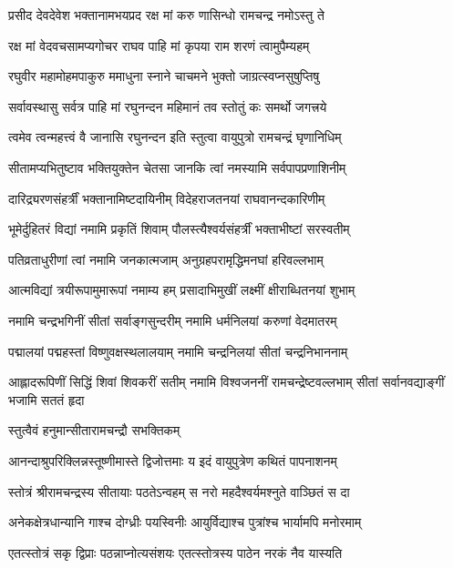 \twolineshloka
{प्रसीद देवदेवेश भक्तानामभयप्रद}
{रक्ष मां करु णासिन्धो रामचन्द्र नमोऽस्तु ते}%

\twolineshloka
{रक्ष मां वेदवचसामप्यगोचर राघव}
{पाहि मां कृपया राम शरणं त्वामुपैम्यहम्}%

\twolineshloka
{रघुवीर महामोहमपाकुरु ममाधुना}
{स्नाने चाचमने भुक्तो जाग्रत्स्वप्नसुषुप्तिषु}%

\twolineshloka
{सर्वावस्थासु सर्वत्र पाहि मां रघुनन्दन}
{महिमानं तव स्तोतुं कः समर्थो जगत्त्रये}%

\twolineshloka
{त्वमेव त्वन्महत्त्वं वै जानासि रघुनन्दन}
{इति स्तुत्वा वायुपुत्रो रामचन्द्रं घृणानिधिम्}%

\twolineshloka
{सीतामप्यभितुष्टाव भक्तियुक्तेन चेतसा}
{जानकि त्वां नमस्यामि सर्वपापप्रणाशिनीम्}%

\twolineshloka
{दारिद्र्यरणसंहर्त्रीं भक्तानामिष्टदायिनीम्}
{विदेहराजतनयां राघवानन्दकारिणीम्}%

\twolineshloka
{भूमेर्दुहितरं विद्यां नमामि प्रकृतिं शिवाम्}
{पौलस्त्यैश्वर्यसंहर्त्रीं भक्ताभीष्टां सरस्वतीम्}%

\twolineshloka
{पतिव्रताधुरीणां त्वां नमामि जनकात्मजाम्}
{अनुग्रहपरामृद्धिमनघां हरिवल्लभाम्}%

\twolineshloka
{आत्मविद्यां त्रयीरूपामुमारूपां नमाम्य हम्}
{प्रसादाभिमुखीं लक्ष्मीं क्षीराब्धितनयां शुभाम्}%

\twolineshloka
{नमामि चन्द्रभगिनीं सीतां सर्वाङ्गसुन्दरीम्}
{नमामि धर्मनिलयां करुणां वेदमातरम्}%

\twolineshloka
{पद्मालयां पद्महस्तां विष्णुवक्षस्थलालयाम्}
{नमामि चन्द्रनिलयां सीतां चन्द्रनिभाननाम्}%

\threelineshloka
{आह्लादरूपिणीं सिद्धिं शिवां शिवकरीं सतीम्}
{नमामि विश्वजननीं रामचन्द्रेष्टवल्लभाम्}
{सीतां सर्वानवद्याङ्गीं भजामि सततं हृदा}%



\onelineshloka
{स्तुत्वैवं हनुमान्सीतारामचन्द्रौ सभक्तिकम्}%

\twolineshloka
{आनन्दाश्रुपरिक्लिन्नस्तूष्णीमास्ते द्विजोत्तमाः}
{य इदं वायुपुत्रेण कथितं पापनाशनम्}%

\twolineshloka
{स्तोत्रं श्रीरामचन्द्रस्य सीतायाः पठतेऽन्वहम्}
{स नरो महदैश्वर्यमश्नुते वाञ्छितं स दा}%

\twolineshloka
{अनेकक्षेत्रधान्यानि गाश्च दोग्ध्रीः पयस्विनीः}
{आयुर्विद्याश्च पुत्रांश्च भार्यामपि मनोरमाम्}%

\twolineshloka
{एतत्स्तोत्रं सकृ द्विप्राः पठन्नाप्नोत्यसंशयः}
{एतत्स्तोत्रस्य पाठेन नरकं नैव यास्यति}%

